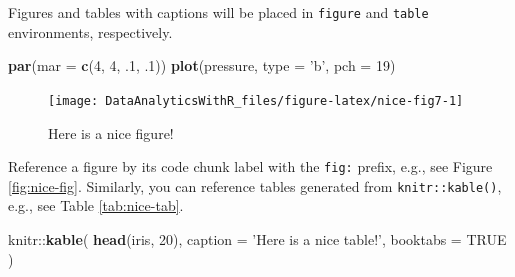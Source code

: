 \documentclass[]{book}
\newenvironment{Shaded}{\begin{snugshade}}{\end{snugshade}}
\newcommand{\KeywordTok}[1]{\textcolor[rgb]{0.13,0.29,0.53}{\textbf{{#1}}}}
\newcommand{\DataTypeTok}[1]{\textcolor[rgb]{0.13,0.29,0.53}{{#1}}}
\newcommand{\DecValTok}[1]{\textcolor[rgb]{0.00,0.00,0.81}{{#1}}}
\newcommand{\StringTok}[1]{\textcolor[rgb]{0.31,0.60,0.02}{{#1}}}
\newcommand{\OtherTok}[1]{\textcolor[rgb]{0.56,0.35,0.01}{{#1}}}
\newcommand{\NormalTok}[1]{{#1}}
\theoremstyle{definition}
\theoremstyle{definition}
\theoremstyle{remark}
\begin{document}
Figures and tables with captions will be placed in \texttt{figure} and
\texttt{table} environments, respectively.

\begin{Shaded}
\begin{Highlighting}[]
\KeywordTok{par}\NormalTok{(}\DataTypeTok{mar =} \KeywordTok{c}\NormalTok{(}\DecValTok{4}\NormalTok{, }\DecValTok{4}\NormalTok{, .}\DecValTok{1}\NormalTok{, .}\DecValTok{1}\NormalTok{))}
\KeywordTok{plot}\NormalTok{(pressure, }\DataTypeTok{type =} \StringTok{'b'}\NormalTok{, }\DataTypeTok{pch =} \DecValTok{19}\NormalTok{)}
\end{Highlighting}
\end{Shaded}

\begin{figure}

{\centering \texttt{[image: DataAnalyticsWithR\_files/figure-latex/nice-fig7-1]} 

}

\caption{Here is a nice figure!}\label{fig:nice-fig7}
\end{figure}

Reference a figure by its code chunk label with the \texttt{fig:}
prefix, e.g., see Figure \ref{fig:nice-fig}. Similarly, you can
reference tables generated from \texttt{knitr::kable()}, e.g., see Table
\ref{tab:nice-tab}.

\begin{Shaded}
\begin{Highlighting}[]
\NormalTok{knitr::}\KeywordTok{kable}\NormalTok{(}
  \KeywordTok{head}\NormalTok{(iris, }\DecValTok{20}\NormalTok{), }\DataTypeTok{caption =} \StringTok{'Here is a nice table!'}\NormalTok{,}
  \DataTypeTok{booktabs =} \OtherTok{TRUE}
\NormalTok{)}
\end{Highlighting}
\end{Shaded}
\end{document}
